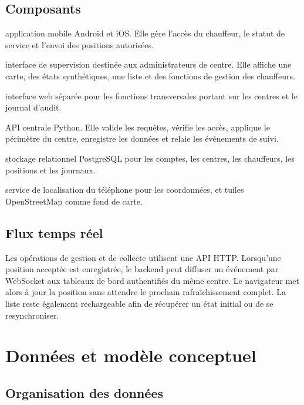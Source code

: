 \documentclass[11pt,a4paper,oneside]{report}
\begin{document}
\section{Composants}

\begin{description}[style=nextline,leftmargin=3.6cm,labelwidth=3.3cm]
  \item[Application chauffeur] application mobile Android et iOS. Elle gère
        l'accès du chauffeur, le statut de service et l'envoi des positions
        autorisées.
  \item[Tableau de bord web] interface de supervision destinée aux
        administrateurs de centre. Elle affiche une carte, des états
        synthétiques, une liste et des fonctions de gestion des chauffeurs.
  \item[Console de plateforme] interface web séparée pour les fonctions
        transversales portant sur les centres et le journal d'audit.
  \item[Backend] API centrale Python. Elle valide les requêtes, vérifie les
        accès, applique le périmètre du centre, enregistre les données et
        relaie les événements de suivi.
  \item[Base de données] stockage relationnel PostgreSQL pour les comptes, les
        centres, les chauffeurs, les positions et les journaux.
  \item[Services externes] service de localisation du téléphone pour les
        coordonnées, et tuiles OpenStreetMap comme fond de carte.
\end{description}

\section{Flux temps réel}

Les opérations de gestion et de collecte utilisent une API HTTP. Lorsqu'une
position acceptée est enregistrée, le backend peut diffuser un événement par
WebSocket aux tableaux de bord authentifiés du même centre. Le navigateur met
alors à jour la position sans attendre le prochain rafraîchissement complet.
La liste reste également rechargeable afin de récupérer un état initial ou de
se resynchroniser.

\chapter{Données et modèle conceptuel}

\section{Organisation des données}
\end{document}
